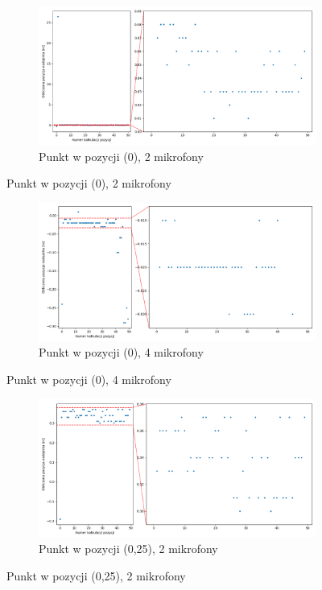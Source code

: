 \begin{figure}[H]
    \centering
    \begin{subfigure}{\textwidth}
        \centering
        \includegraphics[width=\linewidth]{pics/mult_lat_1d/position_[0]_2.png}
        \caption{Punkt w pozycji (0), 2 mikrofony}
        \label{pic:1d_mult_[0]_2}
    \end{subfigure}
\end{figure}
\begin{figure}[H]
    \ContinuedFloat\centering
    \begin{subfigure}{\textwidth}
        \centering
        \includegraphics[width=\linewidth]{pics/mult_lat_1d/position_[0]_4.png}
        \caption{Punkt w pozycji (0), 4 mikrofony}
        \label{pic:1d_mult_[0]_4}
    \end{subfigure}
\end{figure}
\begin{figure}[H]
    \ContinuedFloat\centering
    \begin{subfigure}{\textwidth}
        \centering
        \includegraphics[width=\linewidth]{pics/mult_lat_1d/position_[0.25]_2.png}
        \caption{Punkt w pozycji (0,25), 2 mikrofony}
        \label{pic:1d_mult_[0.25]_2}
    \end{subfigure}
\end{figure}
